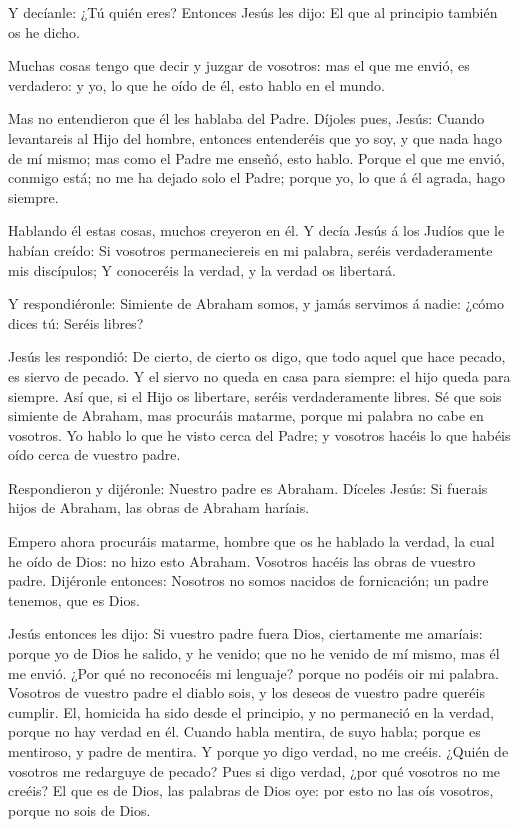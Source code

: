  Y decíanle: ¿Tú quién eres? Entonces Jesús les dijo: El
que al principio también os he dicho.

 Muchas cosas tengo que decir y juzgar de vosotros: mas el
que me envió, es verdadero: y yo, lo que he oído de él, esto hablo en el
mundo.

 Mas no entendieron que él les hablaba del Padre.
 Díjoles pues, Jesús: Cuando levantareis al Hijo del
hombre, entonces entenderéis que yo soy, y que nada hago de mí mismo;
mas como el Padre me enseñó, esto hablo.  Porque el que me
envió, conmigo está; no me ha dejado solo el Padre; porque yo, lo que á
él agrada, hago siempre.

 Hablando él estas cosas, muchos creyeron en él.
 Y decía Jesús á los Judíos que le habían creído: Si
vosotros permaneciereis en mi palabra, seréis verdaderamente mis
discípulos;  Y conoceréis la verdad, y la verdad os
libertará.

 Y respondiéronle: Simiente de Abraham somos, y jamás
servimos á nadie: ¿cómo dices tú: Seréis libres?

 Jesús les respondió: De cierto, de cierto os digo, que
todo aquel que hace pecado, es siervo de pecado.  Y el
siervo no queda en casa para siempre: el hijo queda para siempre.
 Así que, si el Hijo os libertare, seréis verdaderamente
libres.  Sé que sois simiente de Abraham, mas procuráis
matarme, porque mi palabra no cabe en vosotros.  Yo hablo
lo que he visto cerca del Padre; y vosotros hacéis lo que habéis oído
cerca de vuestro padre.

 Respondieron y dijéronle: Nuestro padre es Abraham.
Díceles Jesús: Si fuerais hijos de Abraham, las obras de Abraham
haríais.

 Empero ahora procuráis matarme, hombre que os he hablado
la verdad, la cual he oído de Dios: no hizo esto Abraham. 
Vosotros hacéis las obras de vuestro padre. Dijéronle entonces: Nosotros
no somos nacidos de fornicación; un padre tenemos, que es Dios.

 Jesús entonces les dijo: Si vuestro padre fuera Dios,
ciertamente me amaríais: porque yo de Dios he salido, y he venido; que
no he venido de mí mismo, mas él me envió.  ¿Por qué no
reconocéis mi lenguaje? porque no podéis oir mi palabra. 
Vosotros de vuestro padre el diablo sois, y los deseos de vuestro padre
queréis cumplir. El, homicida ha sido desde el principio, y no
permaneció en la verdad, porque no hay verdad en él. Cuando habla
mentira, de suyo habla; porque es mentiroso, y padre de mentira.
 Y porque yo digo verdad, no me creéis. 
¿Quién de vosotros me redarguye de pecado? Pues si digo verdad, ¿por qué
vosotros no me creéis?  El que es de Dios, las palabras de
Dios oye: por esto no las oís vosotros, porque no sois de Dios.

